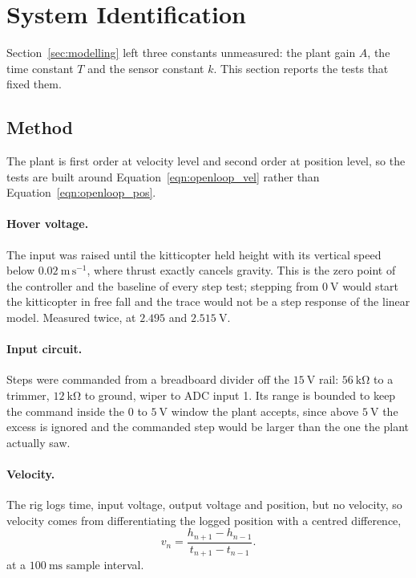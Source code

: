 \section{System Identification}\label{sec:system_id}
Section~\ref{sec:modelling} left three constants unmeasured: the plant gain $A$, the time constant
$T$ and the sensor constant $k$. This section reports the tests that fixed them.

\subsection{Method}
The plant is first order at velocity level and second order at position level, so the tests are
built around Equation~\eqref{eqn:openloop_vel} rather than Equation~\eqref{eqn:openloop_pos}.

\paragraph{Hover voltage.} The input was raised until the kitticopter held height with its
vertical speed below $0.02\ \mathrm{m\,s^{-1}}$, where thrust exactly cancels gravity. This is the
zero point of the controller and the baseline of every step test; stepping from $0\ \mathrm{V}$
would start the kitticopter in free fall and the trace would not be a step response of the linear
model. Measured twice, at $2.495$ and $2.515\ \mathrm{V}$.

\paragraph{Input circuit.} Steps were commanded from a breadboard divider off the
$15\ \mathrm{V}$ rail: $56\ \mathrm{k\Omega}$ to a trimmer, $12\ \mathrm{k\Omega}$ to ground,
wiper to ADC input 1. Its range is bounded to keep the command inside the $0$ to $5\ \mathrm{V}$
window the plant accepts, since above $5\ \mathrm{V}$ the excess is ignored and the commanded step
would be larger than the one the plant actually saw.

\paragraph{Velocity.} The rig logs time, input voltage, output voltage and position, but no
velocity, so velocity comes from differentiating the logged position with a centred difference,
\begin{equation}\label{eqn:central_difference}
    v_n = \frac{h_{n+1} - h_{n-1}}{t_{n+1} - t_{n-1}} .
\end{equation}
at a $100\ \mathrm{ms}$ sample interval.

